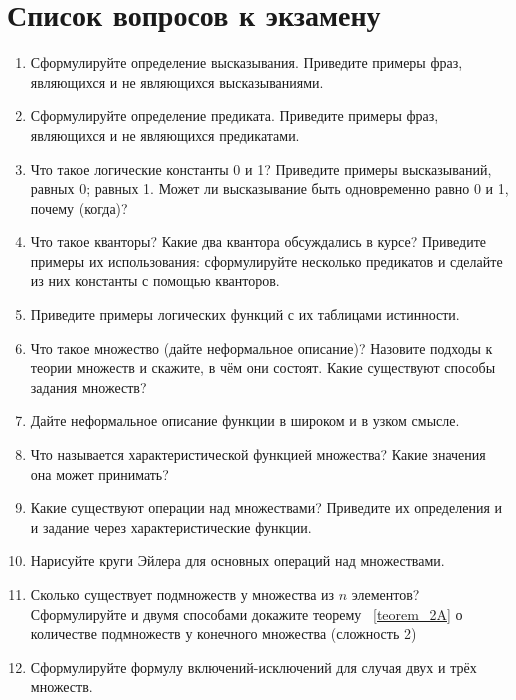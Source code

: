 \documentclass[12pt,oneside]{article}
\theoremstyle{definition}
\begin{document}
\section{Список вопросов к экзамену}
\begin{enumerate}
\item  Сформулируйте определение высказывания. Приведите примеры фраз, являющихся и не являющихся высказываниями.

\item  Сформулируйте определение предиката. Приведите примеры фраз, являющихся и не являющихся предикатами.

\item Что такое логические константы 0 и 1? Приведите примеры высказываний, равных 0; равных 1. Может ли высказывание быть одновременно равно 0 и 1, почему (когда)?

\item  Что такое кванторы? Какие два квантора обсуждались в курсе? Приведите примеры их использования: сформулируйте несколько предикатов и сделайте из них константы с помощью кванторов. 

\item  Приведите примеры логических функций с их таблицами истинности.

\item Что такое множество (дайте неформальное описание)? Назовите подходы к теории множеств и скажите, в чём они состоят. Какие существуют способы задания множеств?

\item Дайте неформальное описание функции в широком и в узком смысле.

\item  Что называется характеристической функцией множества? Какие значения она может принимать?

\item Какие существуют операции над множествами? Приведите их определения и и задание через характеристические функции.

\item Нарисуйте круги Эйлера для основных операций над множествами. 


\item  Сколько существует подмножеств у множества из $n$ элементов? Сформулируйте и двумя способами  докажите теорему ~\ref{teorem_2A} о количестве подмножеств у конечного множества (сложность 2)

\item Сформулируйте формулу включений-исключений для случая двух и трёх множеств.


\end{enumerate}
\end{document}
